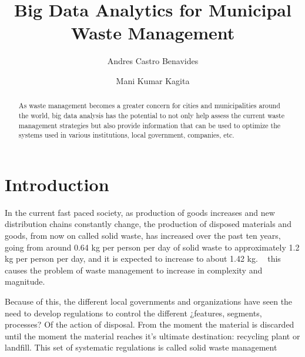 \documentclass[sigconf]{acmart}
\begin{document}
\title{Big Data Analytics for Municipal Waste Management}

\author{Andres Castro Benavides}

\author{Mani Kumar Kagita}
\renewcommand{\shortauthors}{B. Trovato et al.}


\begin{abstract}
As waste management becomes a greater concern for cities and municipalities around the world, big data analysis has the potential to not only help assess the current waste management strategies but also provide information that can be used to optimize the systems used in various institutions, local government, companies, etc.

\end{abstract}




\maketitle


\section{Introduction}


In the current fast paced society, as production of goods increases and new distribution chains constantly change, the production of disposed materials and goods, from now on called solid waste, has increased over the past ten years, going from around 0.64 kg per person per day of solid waste to approximately 1.2 kg per person per day,  and it is expected to increase to about 1.42 kg.
~\cite{hoornweg2012} this causes the problem of waste management to increase in complexity and magnitude.

Because of this, the different local governments and organizations have seen the need to develop regulations to control the different ¿features, segments, processes? Of the action of disposal. From the moment the material is discarded until the moment the material reaches it’s ultimate destination: recycling plant or landfill. This set of systematic regulations is called solid waste management ~\cite{akbarpour2016}
\end{document}
